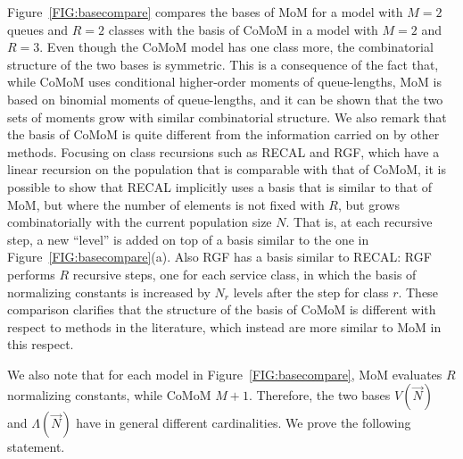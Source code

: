\documentclass[journal,twocolumn,9.5pt]{IEEEtran}
\begin{document}
Figure~\ref{FIG:basecompare} compares the bases of MoM for a model with $M=2$ queues and $R=2$ classes with the basis of CoMoM in a model with $M=2$ and $R=3$.
 Even though the CoMoM model has one class more, the combinatorial structure of the two bases is symmetric. This is a consequence of the fact that, while CoMoM uses conditional higher-order moments of queue-lengths, MoM is based on binomial moments of queue-lengths, and it can be shown that the two sets of moments grow with similar combinatorial structure. We also remark that the basis of CoMoM is quite different from the information carried on by other methods. Focusing on class recursions such as RECAL and RGF, which have a linear recursion on the population that is comparable with that of CoMoM, it is possible to show that RECAL implicitly uses a basis that is similar to that of MoM, but where the number of elements is not fixed with $R$, but grows combinatorially with the current population size $N$. That is, at each recursive step, a new ``level'' is added on top of a basis similar to the one in Figure~\ref{FIG:basecompare}(a). Also RGF has a basis similar to RECAL: RGF performs $R$ recursive steps, one for each service class, in which the basis of normalizing constants is increased by $N_r$ levels after the step for class $r$. These comparison clarifies that the structure of the basis of CoMoM is different with respect to methods in the literature, which instead are more similar to MoM in this respect.

We also note that for each model in Figure~\ref{FIG:basecompare}, MoM evaluates $R$ normalizing constants, while CoMoM $M+1$. Therefore, the two bases $V(\vec N)$ and $\Lambda(\vec N)$ have in general different cardinalities. We prove the following statement.
\end{document}
